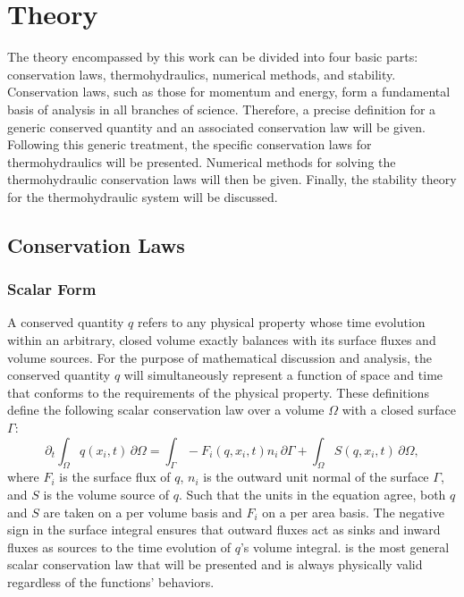 \documentclass[Prelim,12pt]{WisconsinThesis}
\newcommand{\pdt}   {\partial_t}
\newcommand{\V}     {\ensuremath{\Omega}}
\newcommand{\dV}    {\,\partial\V}
\newcommand{\IntV}  {\int_{\V}}
\renewcommand{\S}   {\ensuremath{\Gamma}}
\newcommand{\dS}    {\,\partial\S}
\newcommand{\IntS}  {\int_{\S}}
\newcommand{\q}     {\ensuremath{q}}
\begin{document}
\chapter{Theory}

The theory encompassed by this work can be divided into four basic parts: conservation laws, thermohydraulics, numerical methods, and stability.
Conservation laws, such as those for momentum and energy, form a fundamental basis of analysis in all branches of science.
Therefore, a precise definition for a generic conserved quantity and an associated conservation law will be given.
Following this generic treatment, the specific conservation laws for thermohydraulics will be presented.
Numerical methods for solving the thermohydraulic conservation laws will then be given.
Finally, the stability theory for the thermohydraulic system will be discussed.

\section{Conservation Laws}
\label{CLawDefinition}

\subsection{Scalar Form}
A conserved quantity \q{} refers to any physical property whose time evolution within an arbitrary, closed volume exactly balances with its surface fluxes and volume sources.
For the purpose of mathematical discussion and analysis, the conserved quantity \q{} will simultaneously represent a function of space and time that conforms to the requirements of the physical property.
These definitions define the following scalar conservation law over a volume \V{} with a closed surface \S{}:%
\begin{equation}%
    \pdt\!\IntV \q(x_i,t) \dV = \IntS -F_i(\q,x_i,t) n_i\dS + \IntV S(\q,x_i,t) \dV,
    \label{Eqn:GeneralIntegralCLaw}
\end{equation}
where $F_i$ is the surface flux of \q{}, $n_i$ is the outward unit normal of the surface \S{}, and $S$ is the volume source of \q{}.
Such that the units in the equation agree, both \q{} and $S$ are taken on a per volume basis and $F_i$ on a per area basis.
The negative sign in the surface integral ensures that outward fluxes act as sinks and inward fluxes as sources to the time evolution of \q{}'s volume integral.
 is the most general scalar conservation law that will be presented and is always physically valid regardless of the functions' behaviors.
\end{document}

